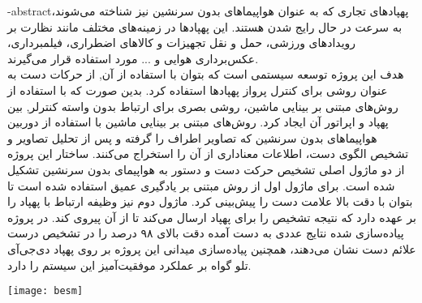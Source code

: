 \department{}
\secondsupervisor{}


\fa-abstract{پهپادهای تجاری که به عنوان هواپیما‌های بدون سرنشین 
نیز شناخته می‌شوند، به سرعت در حال رایج شدن هستند. این پهپاد‌ها در زمینه‌های مختلف مانند نظارت بر رویدادهای ورزشی، حمل و نقل تجهیزات
 و کالاهای اضطراری، فیلمبرداری، عکس‌برداری هوایی و ... مورد استفاده قرار می‌گیرند.
  \\
هدف این پروژه توسعه سیستمی است که بتوان با استفاده از آن, از حرکات دست به عنوان روشی برای کنترل پرواز پهپاد‌ها استفاده کرد.
بدین صورت که با استفاده از روش‌های مبتنی بر بینایی ماشین، روشی بصری برای ارتباط بدون واسته کنترلر, بین پهپاد و اپراتور آن ایجاد کرد.
 روش‌های مبتنی بر بینایی ماشین با استفاده از دوربین هواپیما‌های بدون سرنشین که تصاویر اطراف را گرفته و پس
 از تحلیل تصاویر و تشخیص الگوی دست، اطلاعات معناداری از آن را استخراج می‌کنند. ساختار این پروژه از دو ماژول
 اصلی تشخیص حرکت دست
 و دستور به هواپیمای بدون سرنشین تشکیل شده است. برای ماژول اول از روش مبتنی بر
 یادگیری عمیق
 استفاده شده است تا بتوان با دقت بالا علامت دست را پیش‌بینی کرد. ماژول دوم نیز وظیفه ارتباط با پهپاد را بر عهده دارد که نتیجه تشخیص را برای پهپاد ارسال می‌کند تا از آن پیروی کند.
 در پروژه پیاده‌سازی شده نتایج عددی به دست آمده دقت بالای ۹۸ درصد را در تشخیص درست علائم دست نشان می‌دهند، همچنین پیاده‌سازی میدانی این پروژه بر روی پهپاد دی‌جی‌آی تلو گواه بر عملکرد موفقیت‌آمیز این سیستم را دارد.
 }



\vspace*{7cm}
\thispagestyle{empty}
\begin{center}
\texttt{[image: besm]}
\end{center}